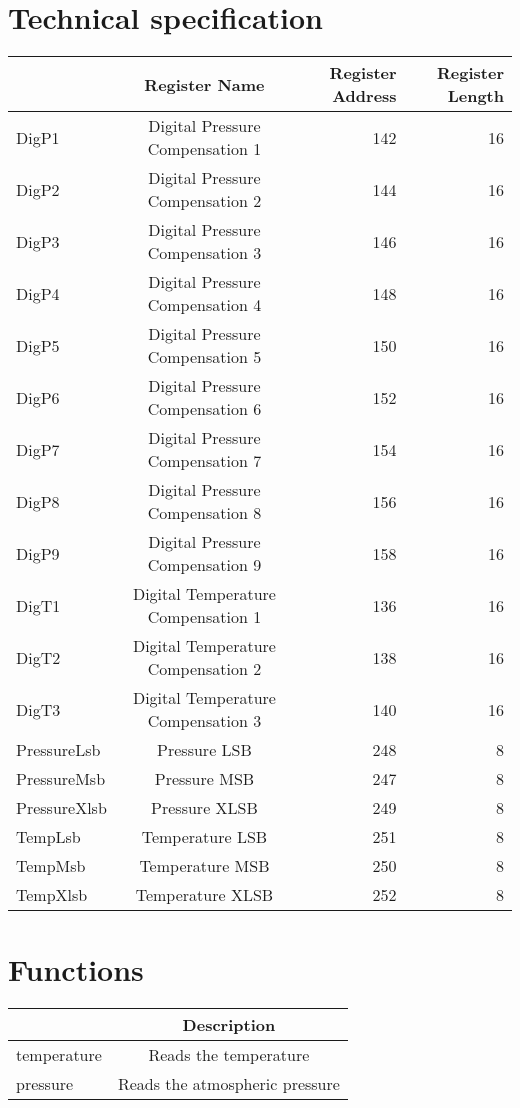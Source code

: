 \documentclass[a4paper,12pt,oneside,pdflatex,italian,final,twocolumn]{article}
\begin{document}
\section{Technical specification}
\centering
\begin{tabular}{lcrr}
\toprule
 & Register Name & Register Address & Register Length \\
\midrule
DigP1 & Digital Pressure Compensation 1 & 142 & 16 \\
DigP2 & Digital Pressure Compensation 2 & 144 & 16 \\
DigP3 & Digital Pressure Compensation 3 & 146 & 16 \\
DigP4 & Digital Pressure Compensation 4 & 148 & 16 \\
DigP5 & Digital Pressure Compensation 5 & 150 & 16 \\
DigP6 & Digital Pressure Compensation 6 & 152 & 16 \\
DigP7 & Digital Pressure Compensation 7 & 154 & 16 \\
DigP8 & Digital Pressure Compensation 8 & 156 & 16 \\
DigP9 & Digital Pressure Compensation 9 & 158 & 16 \\
DigT1 & Digital Temperature Compensation 1 & 136 & 16 \\
DigT2 & Digital Temperature Compensation 2 & 138 & 16 \\
DigT3 & Digital Temperature Compensation 3 & 140 & 16 \\
PressureLsb & Pressure LSB & 248 & 8 \\
PressureMsb & Pressure MSB & 247 & 8 \\
PressureXlsb & Pressure XLSB & 249 & 8 \\
TempLsb & Temperature LSB & 251 & 8 \\
TempMsb & Temperature MSB & 250 & 8 \\
TempXlsb & Temperature XLSB & 252 & 8 \\
\bottomrule
\end{tabular}


\raggedright

\section{Functions}

\centering
\begin{tabular}{lc}
\toprule
  & Description \\
\midrule
temperature & Reads the temperature \\
pressure & Reads the atmospheric pressure \\
\bottomrule
\end{tabular}
\end{document}
